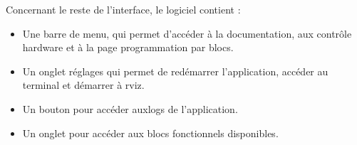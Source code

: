 Concernant le reste de l'interface, le logiciel contient :
\begin{itemize}
    \item Une barre de menu, qui permet d'accéder à la documentation, aux contrôle \gls{hardware} et à la page programmation par blocs.
    \item Un onglet réglages qui permet de redémarrer l'application, accéder au terminal et démarrer à \gls{rviz}.
    \item Un bouton pour accéder aux\gls{logs} de l'application.
    \item Un onglet pour accéder aux blocs fonctionnels disponibles.
\end{itemize}


